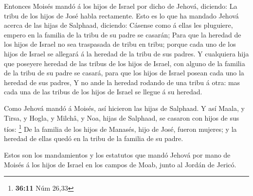  Entonces Moisés mandó á los hijos de Israel por dicho de
Jehová, diciendo: La tribu de los hijos de José habla rectamente.
 Esto es lo que ha mandado Jehová acerca de las hijas de
Salphaad, diciendo: Cásense como á ellas les pluguiere, empero en la
familia de la tribu de su padre se casarán;  Para que la
heredad de los hijos de Israel no sea traspasada de tribu en tribu;
porque cada uno de los hijos de Israel se allegará á la heredad de la
tribu de sus padres.  Y cualquiera hija que poseyere
heredad de las tribus de los hijos de Israel, con alguno de la familia
de la tribu de su padre se casará, para que los hijos de Israel posean
cada uno la heredad de sus padres,  Y no ande la heredad
rodando de una tribu á otra: mas cada una de las tribus de los hijos de
Israel se llegue á su heredad.

 Como Jehová mandó á Moisés, así hicieron las hijas de
Salphaad.  Y así Maala, y Tirsa, y Hogla, y Milchâ, y
Noa, hijas de Salphaad, se casaron con hijos de sus tíos: \footnote{\textbf{36:11}
  Núm 26,33}  De la familia de los hijos de Manasés, hijo
de José, fueron mujeres; y la heredad de ellas quedó en la tribu de la
familia de su padre.

 Estos son los mandamientos y los estatutos que mandó
Jehová por mano de Moisés á los hijos de Israel en los campos de Moab,
junto al Jordán de Jericó.
